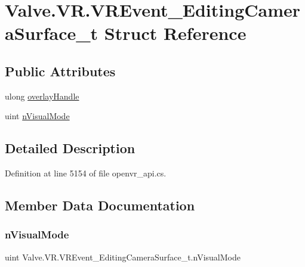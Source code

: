 \hypertarget{struct_valve_1_1_v_r_1_1_v_r_event___editing_camera_surface__t}{}\section{Valve.\+V\+R.\+V\+R\+Event\+\_\+\+Editing\+Camera\+Surface\+\_\+t Struct Reference}
\label{struct_valve_1_1_v_r_1_1_v_r_event___editing_camera_surface__t}
\subsection*{Public Attributes}
\begin{DoxyCompactItemize}
\item 
ulong \mbox{\hyperlink{struct_valve_1_1_v_r_1_1_v_r_event___editing_camera_surface__t_a2180309cb3c6cd7d817864237b1cdcb0}{overlay\+Handle}}
\item 
uint \mbox{\hyperlink{struct_valve_1_1_v_r_1_1_v_r_event___editing_camera_surface__t_a2da90fa1a335c396f80f641a923287e0}{n\+Visual\+Mode}}
\end{DoxyCompactItemize}


\subsection{Detailed Description}


Definition at line 5154 of file openvr\+\_\+api.\+cs.



\subsection{Member Data Documentation}
\mbox{\label{struct_valve_1_1_v_r_1_1_v_r_event___editing_camera_surface__t_a2da90fa1a335c396f80f641a923287e0}} 
\subsubsection{\texorpdfstring{nVisualMode}{nVisualMode}}
{\footnotesize\ttfamily uint Valve.\+V\+R.\+V\+R\+Event\+\_\+\+Editing\+Camera\+Surface\+\_\+t.\+n\+Visual\+Mode}



